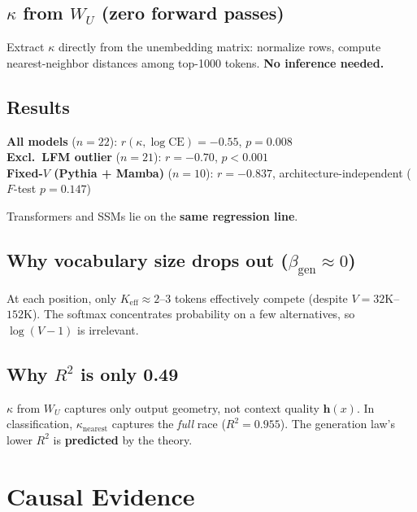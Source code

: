 \documentclass[11pt,a4paper]{article}
\begin{document}
\subsection{$\kappa$ from $W_U$ (zero forward passes)}

Extract $\kappa$ directly from the unembedding matrix: normalize rows, compute nearest-neighbor distances among top-1000 tokens. \textbf{No inference needed.}

\subsection{Results}

\begin{resultbox}
\textbf{All models} ($n{=}22$): $r(\kappa, \log\mathrm{CE}) = -0.55$, $p = 0.008$\\
\textbf{Excl.\ LFM outlier} ($n{=}21$): $r = -0.70$, $p < 0.001$\\
\textbf{Fixed-$V$ (Pythia + Mamba)} ($n{=}10$): $r = -0.837$, architecture-independent ($F$-test $p = 0.147$)

Transformers and SSMs lie on the \textbf{same regression line}.
\end{resultbox}

\subsection{Why vocabulary size drops out ($\beta_\mathrm{gen} \approx 0$)}

At each position, only $K_\mathrm{eff} \approx 2$--3 tokens effectively compete (despite $V = 32$K--$152$K). The softmax concentrates probability on a few alternatives, so $\log(V{-}1)$ is irrelevant.

\subsection{Why $R^2$ is only 0.49}

$\kappa$ from $W_U$ captures only output geometry, not context quality $\mathbf{h}(x)$. In classification, $\kappa_\mathrm{nearest}$ captures the \emph{full} race ($R^2 = 0.955$). The generation law's lower $R^2$ is \textbf{predicted} by the theory.

\section{Causal Evidence}
\end{document}
